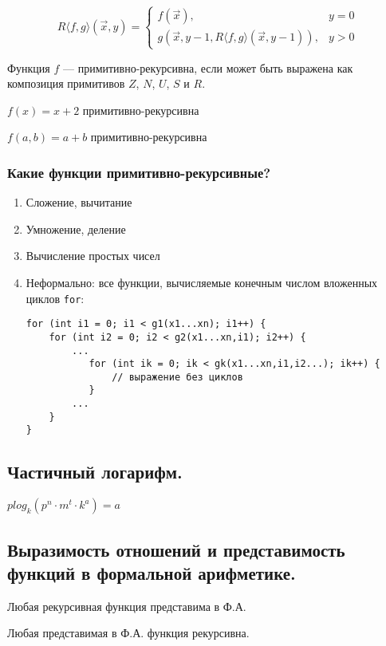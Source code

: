 \documentclass[10pt,a4paper,oneside]{article}
\begin{document}
$$R\langle f,g\rangle(\overrightarrow{x},y)=
 \left\{\begin{array}{ll} 
  f(\overrightarrow{x}), &y=0\\
  g(\overrightarrow{x},y-1,R\langle f,g\rangle (\overrightarrow{x},y-1)), &y > 0
\end{array}\right.$$

 Функция $f$ --- примитивно-рекурсивна, если может быть
выражена как композиция примитивов $Z$, $N$, $U$, $S$ и $R$.

$f(x) = x+2$ примитивно-рекурсивна


$f(a,b) = a+b$ примитивно-рекурсивна

\subsubsection {Какие функции примитивно-рекурсивные?}
\begin{enumerate}
\item Сложение, вычитание
\item Умножение, деление
\item Вычисление простых чисел
\item Неформально: все функции, вычисляемые конечным числом вложенных циклов \verb!for!:

\begin{verbatim}
for (int i1 = 0; i1 < g1(x1...xn); i1++) {
    for (int i2 = 0; i2 < g2(x1...xn,i1); i2++) {
        ...
           for (int ik = 0; ik < gk(x1...xn,i1,i2...); ik++) {
               // выражение без циклов
           }
        ...
    }
}
\end{verbatim}
\end{enumerate}

\subsection{Частичный логарифм.}

$plog_k(p^n \cdot m^t \cdot k^a) = a$

\subsection{Выразимость отношений и представимость функций в формальной арифметике.}
 Любая рекурсивная функция представима в Ф.А.

 Любая представимая в Ф.А. функция рекурсивна.
\end{document}
